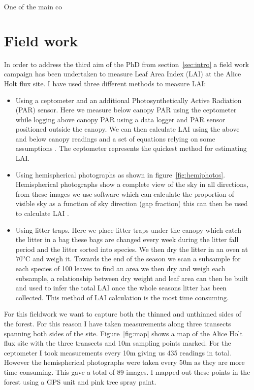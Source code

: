 \documentclass[11pt]{article}
\begin{document}
One of the main co


\section{Field work} \label{sec:fieldwork}

In order to address the third aim of the PhD from section~\ref{sec:intro} a field work campaign has been undertaken to measure Leaf Area Index (LAI) at the Alice Holt flux site. I have used three different methods to measure LAI:
\begin{itemize}
\item Using a ceptometer and an additional Photosynthetically Active Radiation (PAR) sensor. Here we measure below canopy PAR using the ceptometer while logging above canopy PAR using a data logger and PAR sensor positioned outside the canopy. We can then calculate LAI using the above and below canopy readings and a set of equations relying on some assumptions \citep{fassnacht1994comparison}. The ceptometer represents the quickest method for estimating LAI.
\item Using hemispherical photographs as shown in figure~\ref{fig:hemiphotos}. Hemispherical photographs show a complete view of the sky in all directions, from these images we use software which can calculate the proportion of visible sky as a function of sky direction (gap fraction) this can then be used to calculate LAI  \citep{Jonckheere2004}.
\item Using litter traps. Here we place litter traps under the canopy which catch the litter in a bag these bags are changed every week during the litter fall period and the litter sorted into species. We then dry the litter in an oven at $70^{\text{o}}\text{C}$ and weigh it. Towards the end of the season we scan a subsample for each species of 100 leaves  to find an area we then dry and weigh each subsample, a relationship between dry weight and leaf area can then be built and used to infer the total LAI once the whole seasons litter has been collected. This method of LAI calculation is the most time consuming.  
\end{itemize}

For this fieldwork we want to capture both the thinned and unthinned sides of the forest. For this reason I have taken measurements along three transects spanning both sides of the site. Figure~\ref{fig:map} shows a map of the Alice Holt flux site with the three transects and 10m sampling points marked. For the ceptometer I took measurements every 10m giving us 435 readings in total. However the hemispherical photographs were taken every 50m as they are more time consuming. This gave a total of 89 images. I mapped out these points in the forest using a GPS unit and pink tree spray paint. 
\end{document}
